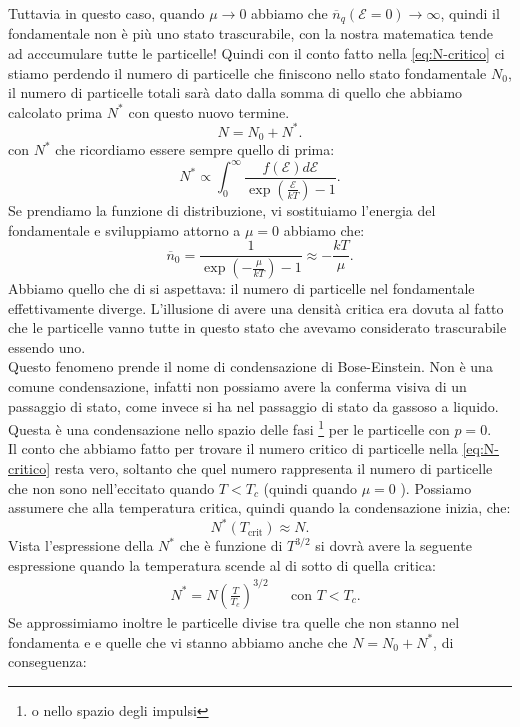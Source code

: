 Tuttavia in questo caso, quando $\mu \to 0$ abbiamo che $\overline{n}_{q}( \mathcal{E} = 0)  \to \infty$, quindi il fondamentale non è più uno stato trascurabile, con la nostra matematica tende ad acccumulare tutte le particelle!
Quindi con il conto fatto nella \ref{eq:N-critico} ci stiamo perdendo il numero di particelle che finiscono nello stato fondamentale $N_0$, il numero di particelle totali sarà dato dalla somma di quello che abbiamo calcolato prima $N^{*}$ con questo nuovo termine.
\[
	N = N_0 + N^{*}
.\] 
con $N^{*}$ che ricordiamo essere sempre quello di prima:
\[
	N^{*} \propto \int_{0}^{\infty} 
	\frac{f( \mathcal{E} ) d\mathcal{E} }
	{\exp\left( \frac{\mathcal{E} }{kT} \right) -1} 
.\] 
Se prendiamo la funzione di distribuzione, vi sostituiamo l'energia del fondamentale e sviluppiamo attorno a $\mu = 0$ abbiamo che:
\[
	\overline{n}_{0} = \frac{1}
		{\exp\left( -\frac{\mu }{kT} \right) -1 } \approx - \frac{kT}{\mu }
.\] 
Abbiamo quello che di si aspettava: il numero di particelle nel fondamentale effettivamente diverge. L'illusione di avere una densità critica era dovuta al fatto che le particelle vanno tutte in questo stato che avevamo considerato trascurabile essendo uno. \\ 
Questo fenomeno prende il nome di condensazione di Bose-Einstein. 
Non è una comune condensazione, infatti non possiamo avere la conferma visiva di un passaggio di stato, come invece si ha nel passaggio di stato da gassoso a liquido. 
Questa è una condensazione nello spazio delle fasi \footnote{o nello spazio degli impulsi} per le particelle con $p =0$. \\
Il conto che abbiamo fatto per trovare il numero critico di particelle nella \ref{eq:N-critico} resta vero, soltanto che quel numero rappresenta il numero di particelle che non sono nell'eccitato quando $T< T_{c}$ (quindi quando $\mu = 0$ ). Possiamo assumere che alla temperatura critica, quindi quando la condensazione inizia, che:
\[
	N^{*}( T_{\text{crit}})  \approx N
.\] 
Vista l'espressione della $N^{*}$ che è funzione di $T^{3 /2}$ si dovrà avere la seguente espressione quando la temperatura scende al di sotto di quella critica:
\begin{align}
	&N^{*} = N \left( \frac{T}{T_{c}} \right)^{3 /2}& & \text{con } T<T_{c}
.\end{align}
Se approssimiamo inoltre le particelle divise tra quelle che non stanno nel fondamenta e e quelle che vi stanno abbiamo anche che $N = N_0 + N^{*}$, di conseguenza:
